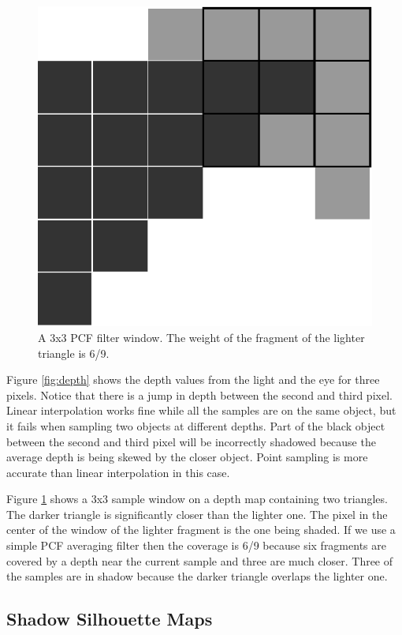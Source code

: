 \documentclass[12pt]{article}
\begin{document}
\begin{figure}
\centering
\includegraphics[scale=0.5]{pcf.eps}
\caption{\label{fig:pcf} A 3x3 PCF filter window. The weight of the fragment of the lighter triangle is 6/9.}
\end{figure}

Figure \ref{fig:depth} shows the depth values from the light and the eye for three pixels. Notice that there is a jump in depth between the second and third pixel. Linear interpolation works fine while all the samples are on the same object, but it fails when sampling two objects at different depths.
Part of the black object between the second and third pixel will be incorrectly shadowed because the average depth is being skewed by the closer object. Point sampling is more accurate than linear interpolation in this case.

Figure \ref{fig:pcf} shows a 3x3 sample window on a depth map containing two triangles. The darker triangle is significantly closer than the lighter one. The pixel in the center of the window of the lighter fragment is the one being shaded. If we use a simple PCF averaging filter then the coverage is 6/9 because six fragments are covered by a depth near the current sample and three are much closer. Three of the samples are in shadow because the darker triangle overlaps the lighter one.

\subsection{Shadow Silhouette Maps}
\end{document}
